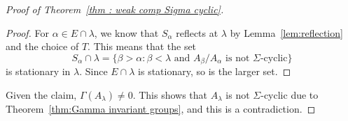 \documentclass[a4paper]{amsart}
\theoremstyle{definition}
\theoremstyle{remark}
\numberwithin{equation}{section}
\begin{document}
\begin{proof}[Proof of Theorem~\ref{thm : weak comp Sigma cyclic}]
        \begin{proof}
            For \(\alpha \in E\cap \lambda\), we know that \(S_\alpha\) reflects at \(\lambda\) by Lemma~\ref{lem:reflection} and the choice of \(T\). This means that the set
            \[S_\alpha \cap \lambda  = \{\beta > \alpha : \beta <\lambda \text{ and } A_\beta/A_\alpha \text{ is not \(\Sigma\)-cyclic}\}
            \]
            is stationary in \(\lambda\). Since \(E\cap \lambda\) is stationary, so is the larger set.
        \end{proof}

         Given the claim, \(\Gamma(A_\lambda)\neq 0\). This shows that \(A_\lambda\) is not \(\Sigma\)-cyclic due to Theorem~\ref{thm:Gamma invariant groups}, and this is a contradiction.
    \end{proof}



\end{document}

